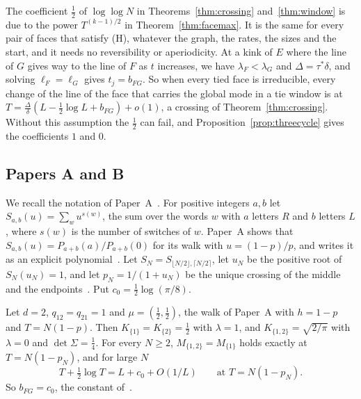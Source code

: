 \begin{remark}\label{rem:half}
The coefficient $\frac12$ of $\log\log N$ in Theorems~\ref{thm:crossing}
and~\ref{thm:window} is due to the power $T^{(k-1)/2}$ in
Theorem~\ref{thm:facemax}. It is the same for every pair of faces that
satisfy (H), whatever the graph, the rates, the sizes and the start, and it
needs no reversibility or aperiodicity. At a kink of $E$ where the line of
$G$ gives way to the line of $F$ as $t$ increases, we have
$\lambda_F<\lambda_G$ and $\Delta=\tau^*\delta$, and solving
$\ell_F=\ell_G$ gives $t_j=b_{FG}$. So when every tied face is irreducible,
every change of the line of the face that carries the global mode in a tie
window is at $T=\frac\Delta\delta(L-\frac12\log L+b_{FG})+o(1)$, a crossing of
Theorem~\ref{thm:crossing}. Without this assumption the $\frac12$ can fail, and
Proposition~\ref{prop:threecycle} gives the coefficients $1$ and $0$.
\end{remark}

\subsection{Papers A and B}\label{sec:papersAB}

We recall the notation of Paper~A~\cite{paperA}. For positive integers $a,b$
let $S_{a,b}(u)=\sum_wu^{s(w)}$, the sum over the words $w$ with $a$ letters
$R$ and $b$ letters $L$, where $s(w)$ is the number of switches of $w$. Paper~A
shows that $S_{a,b}(u)=P_{a+b}(a)/P_{a+b}(0)$ for its walk with $u=(1-p)/p$,
and writes it as an explicit polynomial~\cite[Eq.~(9)]{paperA}. Let
$S_N=S_{\lfloor N/2\rfloor,\lceil N/2\rceil}$, let $u_N$ be the positive root
of $S_N(u_N)=1$, and let $p_N=1/(1+u_N)$ be the unique crossing of the middle
and the endpoints~\cite[Theorem~5.1]{paperA}. Put $c_0=\frac12\log(\pi/8)$.

\begin{corollary}[Paper A]\label{cor:paperA}
Let $d=2$, $q_{12}=q_{21}=1$ and $\mu=(\frac12,\frac12)$, the walk of Paper~A
with $h=1-p$ and $T=N(1-p)$. Then $K_{\{1\}}=K_{\{2\}}=\frac12$ with
$\lambda=1$, and $K_{\{1,2\}}=\sqrt{2/\pi}$ with $\lambda=0$ and
$\det\Sigma=\frac14$. For every $N\ge2$, $M_{\{1,2\}}=M_{\{1\}}$ holds exactly
at $T=N(1-p_N)$, and for large $N$
\[
T+\tfrac12\log T=L+c_0+O(1/L)\qquad\text{at }T=N(1-p_N).
\]
So $b_{FG}=c_0$, the constant of~\cite[Theorem~5.2]{paperA}.
\end{corollary}

